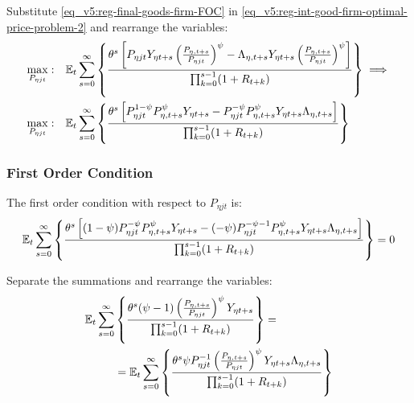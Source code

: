 \documentclass[../thesis.tex]{subfiles}
\begin{document}
Substitute \ref{eq_v5:reg-final-goods-firm-FOC} in \ref{eq_v5:reg-int-good-firm-optimal-price-problem-2} and rearrange the variables:
\begin{align}
	\max_{P_{\eta jt}}: & \quad {\mathbb{E}_{t}} \sum_{s=0}^{\infty} \left\{ \frac{\theta^s \left[ P_{\eta jt} Y_{\eta t+s} \left( \frac{P_{\eta, t+s}}{P_{\eta jt}} \right)^{\psi} - \Lambda_{\eta, t+s} Y_{\eta t+s} \left( \frac{P_{\eta, t+s}}{P_{\eta jt}} \right)^{\psi} \right]}{\prod_{k=0}^{s-1}(1+R_{t+k})} \right\} \implies \nonumber 
	\\
	\max_{P_{\eta jt}}: & \quad {\mathbb{E}_{t}} \sum_{s=0}^{\infty} \left\{ \frac{\theta^s \left[ P_{\eta jt}^{1-\psi} P_{\eta, t+s}^{\psi} Y_{\eta t+s} - P_{\eta jt}^{-\psi} P_{\eta, t+s}^{\psi} Y_{\eta t+s} \Lambda_{\eta, t+s} \right]}{\prod_{k=0}^{s-1}(1+R_{t+k})} \right\} \nonumber
\end{align}


\subsubsection*{First Order Condition}

The first order condition with respect to $P_{\eta jt}$ is:
\begin{align}
	& \quad {\mathbb{E}_{t}} \sum_{s=0}^{\infty} \left\{ \frac{\theta^s \left[ (1-\psi) P_{\eta jt}^{-\psi} P_{\eta, t+s}^{\psi} Y_{\eta t+s} - (-\psi) P_{\eta jt}^{-\psi-1} P_{\eta, t+s}^{\psi} Y_{\eta t+s} \Lambda_{\eta, t+s} \right]}{\prod_{k=0}^{s-1}(1+R_{t+k})} \right\} = 0 \nonumber
\end{align}


Separate the summations and rearrange the variables:
\begin{align}
	\begin{split}
		{\mathbb{E}_{t}} \sum_{s=0}^{\infty} &\left\{ \frac{\theta^s (\psi-1) \left( \frac{P_{\eta, t+s}} {P_{\eta jt}} \right)^{\psi} Y_{\eta t+s}} {\prod_{k=0}^{s-1} (1+R_{t+k})} \right\} = \\
		&= {\mathbb{E}_{t}} \sum_{s=0}^{\infty} \left\{ \frac{\theta^s \psi P_{\eta jt}^{-1} \left( \frac{P_{\eta, t+s}} {P_{\eta jt}} \right)^{\psi} Y_{\eta t+s} \Lambda_{\eta, t+s}}{\prod_{k=0}^{s-1}(1+R_{t+k})} \right\} \label{eq_v5:reg-int-good-firm-optimal-price-FOC}
	\end{split}
\end{align}

\end{document}
